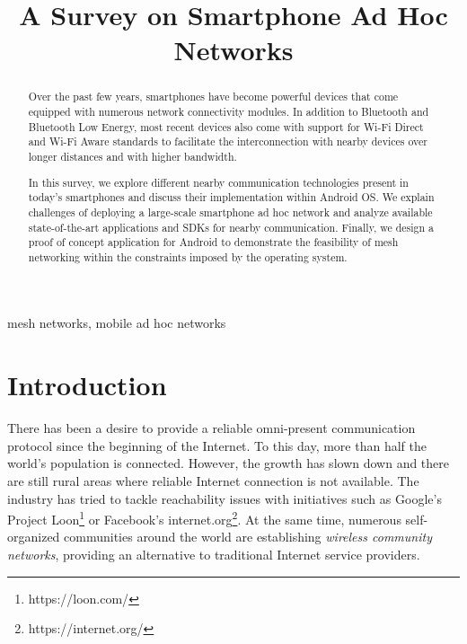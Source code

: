 \documentclass[conference,compsoc]{IEEEtran}
\begin{document}
\title{A Survey on Smartphone Ad Hoc Networks}

\author{
}

\maketitle

\begin{abstract}
Over the past few years, smartphones have become powerful devices that come equipped with numerous network connectivity modules. In addition to Bluetooth and Bluetooth Low Energy, most recent devices also come with support for Wi-Fi Direct and Wi-Fi Aware standards to facilitate the interconnection with nearby devices over longer distances and with higher bandwidth.

In this survey, we explore different nearby communication technologies  present in today's smartphones and discuss their implementation within Android OS. We explain challenges of deploying a large-scale smartphone ad hoc network and analyze available state-of-the-art applications and SDKs for nearby communication. Finally, we design a proof of concept application for Android to demonstrate the feasibility of mesh networking within the constraints imposed by the operating system.

\end{abstract}

\begin{IEEEkeywords}mesh networks, mobile ad hoc networks\end{IEEEkeywords}

\section{Introduction}


There has been a desire to provide a reliable omni-present communication protocol since the beginning of the Internet. To this day, more than half the world's population is connected. However, the growth has slown down and there are still rural areas where reliable Internet connection is not available. The industry has tried to tackle reachability issues with initiatives such as Google's Project Loon\footnote{https://loon.com/} or Facebook's internet.org\footnote{https://internet.org/}. At the same time, numerous self-organized communities around the world are establishing \textit{wireless community networks}, providing an alternative to traditional Internet service providers. \cite{wcn}
\end{document}
